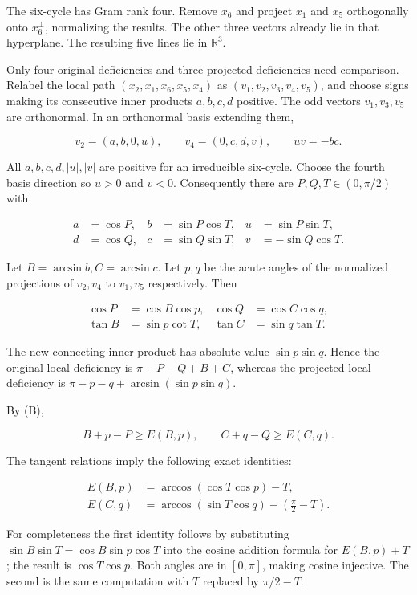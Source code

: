 \documentclass[11pt,a4paper]{article}
\begin{document}
The six-cycle has Gram rank four. Remove \(x_6\) and project \(x_1\) and \(x_5\) orthogonally onto \(x_6^\perp\), normalizing the results. The other three vectors already lie in that hyperplane. The resulting five lines lie in \(\mathbb R^3\).

Only four original deficiencies and three projected deficiencies need comparison. Relabel the local path \((x_2,x_1,x_6,x_5,x_4)\) as \((v_1,v_2,v_3,v_4,v_5)\), and choose signs making its consecutive inner products \(a,b,c,d\) positive. The odd vectors \(v_1,v_3,v_5\) are orthonormal. In an orthonormal basis extending them,

\[
v_2=(a,b,0,u),\qquad v_4=(0,c,d,v),\qquad uv=-bc.
\]

All \(a,b,c,d,|u|,|v|\) are positive for an irreducible six-cycle. Choose the fourth basis direction so \(u>0\) and \(v<0\). Consequently there are \(P,Q,T\in(0,\pi/2)\) with

\[
\begin{aligned}a&=\cos P,&b&=\sin P\cos T,&u&=\sin P\sin T,\\d&=\cos Q,&c&=\sin Q\sin T,&v&=-\sin Q\cos T.\end{aligned}
\]

Let \(B=\arcsin b,C=\arcsin c\). Let \(p,q\) be the acute angles of the normalized projections of \(v_2,v_4\) to \(v_1,v_5\) respectively. Then

\[
\begin{aligned}\cos P&=\cos B\cos p,&\cos Q&=\cos C\cos q,\\\tan B&=\sin p\cot T,&\tan C&=\sin q\tan T.\end{aligned}
\]

The new connecting inner product has absolute value \(\sin p\sin q\). Hence the original local deficiency is \(\pi-P-Q+B+C\), whereas the projected local deficiency is \(\pi-p-q+\arcsin(\sin p\sin q)\).

By (B),

\[
B+p-P\ge E(B,p),\qquad C+q-Q\ge E(C,q).
\]

The tangent relations imply the following exact identities:

\[
\begin{aligned}E(B,p)&=\arccos(\cos T\cos p)-T,\\E(C,q)&=\arccos(\sin T\cos q)-\left(\frac{\pi}{2}-T\right).\end{aligned}
\]

For completeness the first identity follows by substituting \(\sin B\sin T=\cos B\sin p\cos T\) into the cosine addition formula for \(E(B,p)+T\); the result is \(\cos T\cos p\). Both angles are in \([0,\pi]\), making cosine injective. The second is the same computation with \(T\) replaced by \(\pi/2-T\).
\end{document}
